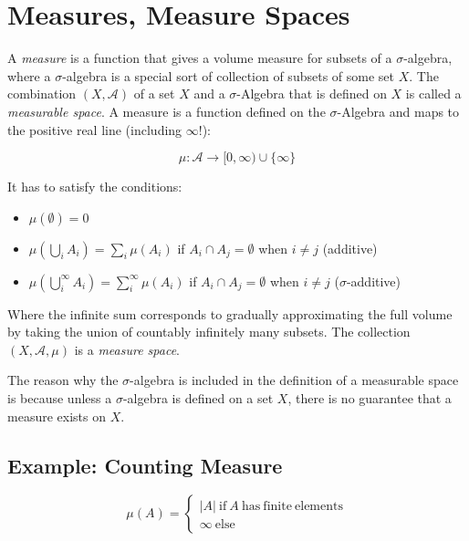 \section{Measures, Measure Spaces}
A \textit{measure} is a function that gives a volume measure for subsets of a $\sigma$-algebra, where a $\sigma$-algebra is a special sort of collection of subsets of some set $X$. 
The combination $(X,\mathscr{A})$ of a set $X$ and a $\sigma$-Algebra that is defined on $X$ is called a \textit{measurable space}. A measure is a function defined on the $\sigma$-Algebra and maps to the positive real line (including $\infty$!):

\begin{equation}
\mu: \mathscr{A} \rightarrow [0,\infty)\cup\{\infty\} 
\end{equation}

It has to satisfy the conditions:

\begin{itemize}
\item $\mu(\emptyset) = 0$
\item $\mu(\bigcup_i A_i) = \sum_i \mu(A_i)$ if $A_i \cap A_j = \emptyset$ when $i\neq j$ (additive)
\item $\mu(\bigcup^{\infty}_i A_i) = \sum^{\infty}_i \mu(A_i)$ if $A_i \cap A_j = \emptyset$ when $i\neq j$ ($\sigma$-additive) 
\end{itemize}

Where the infinite sum corresponds to gradually approximating the full volume by taking the union of countably infinitely many subsets. The collection $(X,\mathscr{A},\mu)$ is a \textit{measure space}. 

The reason why the $\sigma$-algebra is included in the definition of a measurable space is because unless a $\sigma$-algebra is defined on a set $X$, there is no guarantee that a measure exists on $X$.

\subsection{Example: Counting Measure}

\begin{equation}
\mu(A) = \left\{\begin{array}{l} |A| \mathrm{\ if\ }A\mathrm{\ has\ finite\ elements}\\ \infty\mathrm{\ else}\end{array}\right.
\end{equation}

